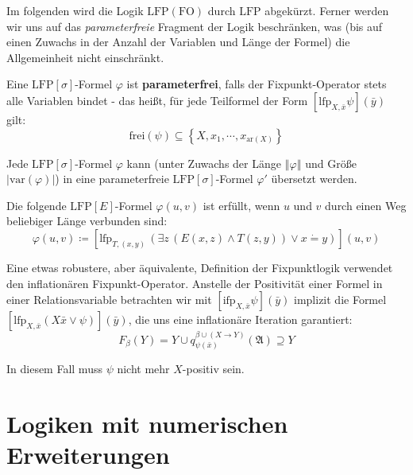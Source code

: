 Im folgenden wird die Logik $\mathrm{LFP}\left(\mathrm{FO}\right)$
durch $\mathrm{LFP}$ abgekürzt. Ferner werden wir uns auf das \emph{parameterfreie}
Fragment der Logik beschränken, was (bis auf einen Zuwachs in der
Anzahl der Variablen und Länge der Formel) die Allgemeinheit nicht
einschränkt.
\begin{defn}
\label{def:fp-paramfree}Eine $\mathrm{LFP}\left[\sigma\right]$-Formel
$\varphi$ ist \textbf{parameterfrei}, falls der Fixpunkt-Operator
stets alle Variablen bindet - das heißt, für jede Teilformel der Form
$\left[\mathrm{lfp}_{X,\bar{x}}\psi\right]\left(\bar{y}\right)$ gilt:
\[
\mathrm{frei}\left(\psi\right)\subseteq\left\{ X,x_{1},\cdots,x_{\mathrm{ar}\left(X\right)}\right\} 
\]
\end{defn}
\begin{prop}
\label{prop:fp-paramfree}Jede $\mathrm{LFP}\left[\sigma\right]$-Formel
$\varphi$ kann (unter Zuwachs der Länge $\left\Vert \varphi\right\Vert $
und Größe $\left|\mathrm{var}\left(\varphi\right)\right|$) in eine
parameterfreie $\mathrm{LFP}\left[\sigma\right]$-Formel $\varphi'$
übersetzt werden.\cite{Zaid,Grohe2005,Dziembowski96bounded-variablefixpoint}
\end{prop}
\begin{example}
Die folgende $\mathrm{LFP}\left[E\right]$-Formel $\varphi\left(u,v\right)$
ist erfüllt, wenn $u$ und $v$ durch einen Weg beliebiger Länge verbunden
sind: 
\[
\varphi\left(u,v\right)\coloneqq\left[\mathrm{lfp}_{T,\left(x,y\right)}\,\left(\exists z\,\left(E\left(x,z\right)\wedge T\left(z,y\right)\right)\vee x\dot{=}y\right)\right]\left(u,v\right)
\]
\end{example}
\begin{defn}
Eine etwas robustere, aber äquivalente, Definition der Fixpunktlogik
verwendet den inflationären Fixpunkt-Operator. Anstelle der Positivität
einer Formel in einer Relationsvariable betrachten wir mit $\left[\mathrm{ifp}_{X,\bar{x}}\psi\right]\left(\bar{y}\right)$
implizit die Formel $\left[\mathrm{lfp}_{X,\bar{x}}\left(X\bar{x}\vee\psi\right)\right]\left(\bar{y}\right)$,
die uns eine inflationäre Iteration garantiert:
\[
F_{\beta}\left(Y\right)=Y\cup q_{\psi\left(\bar{x}\right)}^{\beta\cup\left(X\rightarrow Y\right)}\left(\mathfrak{A}\right)\supseteq Y
\]

In diesem Fall muss $\psi$ nicht mehr $X$-positiv sein.
\end{defn}

\section{Logiken mit numerischen Erweiterungen}


